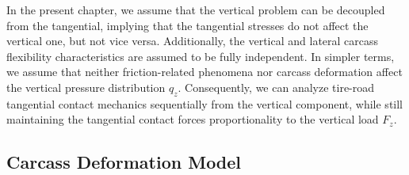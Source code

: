 In the present chapter, we assume that the vertical problem can be decoupled from the tangential, implying that the tangential stresses do not affect the vertical one, but not vice versa. Additionally, the vertical and lateral carcass flexibility characteristics are assumed to be fully independent. In simpler terms, we assume that neither friction-related phenomena nor carcass deformation affect the vertical pressure distribution $q_z$. Consequently, we can analyze tire-road tangential contact mechanics sequentially from the vertical component, while still maintaining the tangential contact forces proportionality to the vertical load $F_z$.


\subsection{Carcass Deformation Model}
\label{app3:sec:carcass_model}


